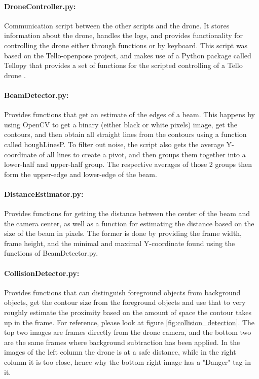 \paragraph{DroneController.py:} Communication script between the other scripts and the drone. It stores information about the drone, handles the logs, and provides functionality for controlling the drone either through functions or by keyboard. This script was based on the Tello-openpose project, and makes use of a Python package called Tellopy that provides a set of functions for the scripted controlling of a Tello drone \citep{tellopy}.

\paragraph{BeamDetector.py:} Provides functions that get an estimate of the edges of a beam. This happens by using OpenCV to get a binary (either black or white pixels) image, get the contours, and then obtain all straight lines from the contours using a function called \gls{houghLinesP}. To filter out noise, the script also gets the average Y-coordinate of all lines to create a pivot, and then groups them together into a lower-half and upper-half group. The respective averages of those 2 groups then form the upper-edge and lower-edge of the beam.

\paragraph{DistanceEstimator.py:} Provides functions for getting the distance between the center of the beam and the camera center, as well as a function for estimating the distance based on the size of the beam in pixels. The former is done by providing the frame width, frame height, and the minimal and maximal Y-coordinate found using the functions of BeamDetector.py.

\paragraph{CollisionDetector.py:} Provides functions that can distinguish foreground objects from background objects, get the contour size from the foreground objects and use that to very roughly estimate the proximity based on the amount of space the contour takes up in the frame. For reference, please look at figure \ref{fig:collision_detection}. The top two images are frames directly from the drone camera, and the bottom two are the same frames where background subtraction has been applied. In the images of the left column the drone is at a safe distance, while in the right column it is too close, hence why the bottom right image has a "Danger" tag in it.

